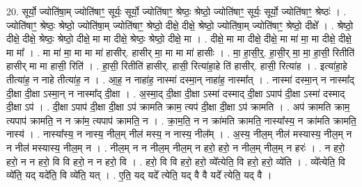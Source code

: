 \documentclass[17pt]{extarticle}
\begin{document}
20. सूर्यो॒ ज्योति॑षा॒म् ज्योति॑षाꣳ॒॒ सूर्यः॒ सूर्यो॒ ज्योति॑षाꣳ॒॒ श्रेष्ठः॒ श्रेष्ठो॒ ज्योति॑षाꣳ॒॒ सूर्यः॒ सूर्यो॒ ज्योति॑षाꣳ॒॒ श्रेष्ठः॑ । . ज्योति॑षाꣳ॒॒ श्रेष्ठः॒ श्रेष्ठो॒ ज्योति॑षा॒म् ज्योति॑षाꣳ॒॒ श्रेष्ठो॒ दीक्षे॒ दीक्षे॒ श्रेष्ठो॒ ज्योति॑षा॒म् ज्योति॑षाꣳ॒॒ श्रेष्ठो॒ दीक्षे᳚ । . श्रेष्ठो॒ दीक्षे॒ दीक्षे॒ श्रेष्ठः॒ श्रेष्ठो॒ दीक्षे॒ मा मा दीक्षे॒ श्रेष्ठः॒ श्रेष्ठो॒ दीक्षे॒ मा । . दीक्षे॒ मा मा दीक्षे॒ दीक्षे॒ मा मा॑ मा॒ मा दीक्षे॒ दीक्षे॒ मा मा᳚ । . मा मा॑ मा॒ मा मा मा॑ हासीर्. हासीर् मा॒ मा मा मा॑ हासीः । . मा॒ हा॒सी॒र्॒. हा॒सी॒र् मा॒ मा॒ हा॒सी॒ रितीति॑ हासीर् मा मा हासी॒ रिति॑ । . हा॒सी॒ रितीति॑ हासीर्. हासी॒ रित्या॑हा॒हे ति॑ हासीर्. हासी॒ रित्या॑ह । . इत्या॑हा॒हे तीत्या॑ह॒ न नाहे तीत्या॑ह॒ न । . आ॒ह॒ न नाहा॑ह॒ नास्मा॑ दस्मा॒न् नाहा॑ह॒ नास्मा᳚त् । . नास्मा॑ दस्मा॒न् न नास्मा᳚द् दी॒क्षा दी॒क्षा ऽस्मा॒न् न नास्मा᳚द् दी॒क्षा । . अ॒स्मा॒द् दी॒क्षा दी॒क्षा ऽस्मा॑ दस्माद् दी॒क्षा ऽपाप॑ दी॒क्षा ऽस्मा॑ दस्माद् दी॒क्षा ऽप॑ । . दी॒क्षा ऽपाप॑ दी॒क्षा दी॒क्षा ऽप॑ क्रामति क्राम॒ त्यप॑ दी॒क्षा दी॒क्षा ऽप॑ क्रामति । . अप॑ क्रामति क्राम॒ त्यपाप॑ क्रामति॒ न न क्रा॑म॒ त्यपाप॑ क्रामति॒ न । . क्रा॒म॒ति॒ न न क्रा॑मति क्रामति॒ नास्या᳚स्य॒ न क्रा॑मति क्रामति॒ नास्य॑ । . नास्या᳚स्य॒ न नास्य॒ नील॒म् नील॑ मस्य॒ न नास्य॒ नील᳚म् । . अ॒स्य॒ नील॒म् नील॑ मस्यास्य॒ नील॒म् न न नील॑ मस्यास्य॒ नील॒म् न । . नील॒म् न न नील॒म् नील॒म् न हरो॒ हरो॒ न नील॒म् नील॒म् न हरः॑ । . न हरो॒ हरो॒ न न हरो॒ वि वि हरो॒ न न हरो॒ वि । . हरो॒ वि वि हरो॒ हरो॒ व्ये᳚त्येति॒ वि हरो॒ हरो॒ व्ये॑ति । . व्ये᳚त्येति॒ वि व्ये॑ति॒ यद् यदे॑ति॒ वि व्ये॑ति॒ यत् । . ए॒ति॒ यद् यदे᳚ त्येति॒ यद् वै वै यदे᳚ त्येति॒ यद् वै । \newline
\end{document}
